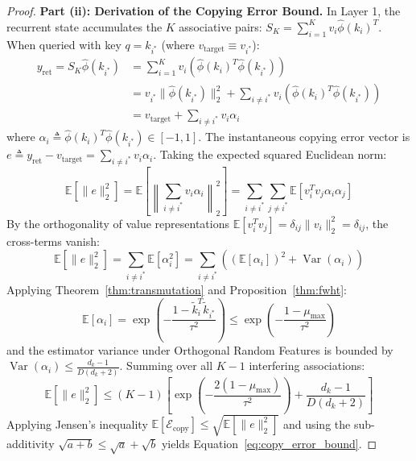 \begin{proof}
\bigskip
\noindent
\textbf{Part (ii): Derivation of the Copying Error Bound.}
In Layer 1, the recurrent state accumulates the $K$ associative pairs: $S_K = \sum_{i=1}^K v_i \hat{\phi}(k_i)^T$. When queried with key $q = k_{i^*}$ (where $v_{\text{target}} \equiv v_{i^*}$):
\begin{align}
y_{\text{ret}} = S_K \hat{\phi}(k_{i^*}) &= \sum_{i=1}^K v_i \left( \hat{\phi}(k_i)^T \hat{\phi}(k_{i^*}) \right) \nonumber \\
&= v_{i^*} \|\hat{\phi}(k_{i^*})\|_2^2 + \sum_{i \neq i^*} v_i \left( \hat{\phi}(k_i)^T \hat{\phi}(k_{i^*}) \right) \nonumber \\
&= v_{\text{target}} + \sum_{i \neq i^*} v_i \alpha_i
\end{align}
where $\alpha_i \triangleq \hat{\phi}(k_i)^T \hat{\phi}(k_{i^*}) \in [-1, 1]$. The instantaneous copying error vector is $e \triangleq y_{\text{ret}} - v_{\text{target}} = \sum_{i \neq i^*} v_i \alpha_i$.
Taking the expected squared Euclidean norm:
\begin{equation}
\mathbb{E}\left[ \|e\|_2^2 \right] = \mathbb{E}\left[ \left\| \sum_{i \neq i^*} v_i \alpha_i \right\|_2^2 \right] = \sum_{i \neq i^*} \sum_{j \neq i^*} \mathbb{E}\left[ v_i^T v_j \alpha_i \alpha_j \right]
\end{equation}
By the orthogonality of value representations $\mathbb{E}[v_i^T v_j] = \delta_{ij} \|v_i\|_2^2 = \delta_{ij}$, the cross-terms vanish:
\begin{equation}
\mathbb{E}\left[ \|e\|_2^2 \right] = \sum_{i \neq i^*} \mathbb{E}\left[ \alpha_i^2 \right] = \sum_{i \neq i^*} \left( (\mathbb{E}[\alpha_i])^2 + \operatorname{Var}(\alpha_i) \right)
\end{equation}
Applying Theorem~\ref{thm:transmutation} and Proposition~\ref{thm:fwht}:
\begin{equation}
\mathbb{E}[\alpha_i] = \exp\left( -\frac{1 - \tilde{k}_i^T \tilde{k}_{i^*}}{\tau^2} \right) \le \exp\left( -\frac{1 - \mu_{\max}}{\tau^2} \right)
\end{equation}
and the estimator variance under Orthogonal Random Features is bounded by $\operatorname{Var}(\alpha_i) \le \frac{d_k - 1}{D(d_k + 2)}$. Summing over all $K - 1$ interfering associations:
\begin{equation}
\mathbb{E}\left[ \|e\|_2^2 \right] \le (K - 1) \left[ \exp\left( -\frac{2(1 - \mu_{\max})}{\tau^2} \right) + \frac{d_k - 1}{D(d_k + 2)} \right]
\end{equation}
Applying Jensen's inequality $\mathbb{E}[\mathcal{E}_{\text{copy}}] \le \sqrt{\mathbb{E}[\|e\|_2^2]}$ and using the sub-additivity $\sqrt{a + b} \le \sqrt{a} + \sqrt{b}$ yields Equation~\ref{eq:copy_error_bound}.


\end{proof}
